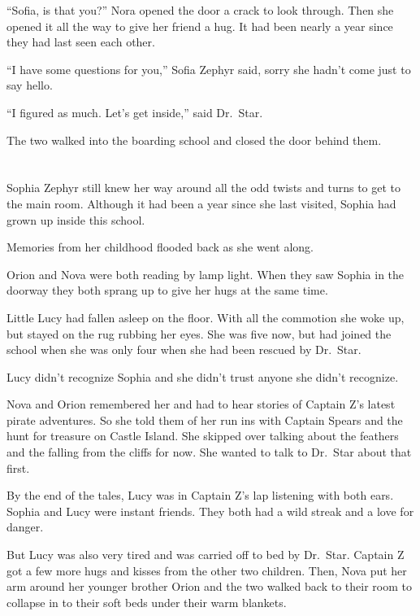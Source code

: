 \documentclass[12pt]{extbook}
\begin{document}
  \enquote{Sofia, is that you?} Nora opened the door a crack to look
  through. Then she opened it all the way to give her friend a hug. It had
  been nearly a year since they had last seen each other.
  
  \enquote{I have some questions for you,} Sofia Zephyr said, sorry she
  hadn't come just to say hello.
  
  \enquote{I figured as much. Let's get inside,} said Dr.~Star.
  
  The two walked into the boarding school and closed the door behind them.
  
  \section{}\label{section-26}
  
  Sophia Zephyr still knew her way around all the odd twists and turns to
  get to the main room. Although it had been a year since she last
  visited, Sophia had grown up inside this school.
  
  Memories from her childhood flooded back as she went along.
  
  Orion and Nova were both reading by lamp light. When they saw Sophia in
  the doorway they both sprang up to give her hugs at the same time.
  
  Little Lucy had fallen asleep on the floor. With all the commotion she
  woke up, but stayed on the rug rubbing her eyes. She was five now, but
  had joined the school when she was only four when she had been rescued
  by Dr.~Star.
  
  Lucy didn't recognize Sophia and she didn't trust anyone she didn't
  recognize.
  
  Nova and Orion remembered her and had to hear stories of Captain Z's
  latest pirate adventures. So she told them of her run ins with Captain
  Spears and the hunt for treasure on Castle Island. She skipped over
  talking about the feathers and the falling from the cliffs for now. She
  wanted to talk to Dr.~Star about that first.
  
  By the end of the tales, Lucy was in Captain Z's lap listening with both
  ears. Sophia and Lucy were instant friends. They both had a wild streak
  and a love for danger.
  
  But Lucy was also very tired and was carried off to bed by Dr.~Star.
  Captain Z got a few more hugs and kisses from the other two children.
  Then, Nova put her arm around her younger brother Orion and the two
  walked back to their room to collapse in to their soft beds under their
  warm blankets.
  
\end{document}
